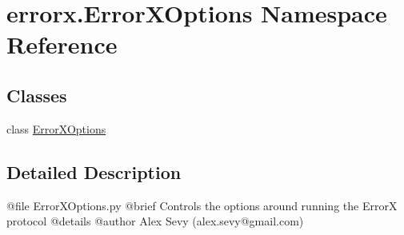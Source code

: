\hypertarget{namespaceerrorx_1_1_error_x_options}{}\section{errorx.\+Error\+X\+Options Namespace Reference}
\label{namespaceerrorx_1_1_error_x_options}
\subsection*{Classes}
\begin{DoxyCompactItemize}
\item 
class \mbox{\hyperlink{classerrorx_1_1_error_x_options_1_1_error_x_options}{Error\+X\+Options}}
\end{DoxyCompactItemize}


\subsection{Detailed Description}
\begin{DoxyVerb}@file ErrorXOptions.py
@brief Controls the options around running the ErrorX protocol
@details 
@author Alex Sevy (alex.sevy@gmail.com)
\end{DoxyVerb}
 